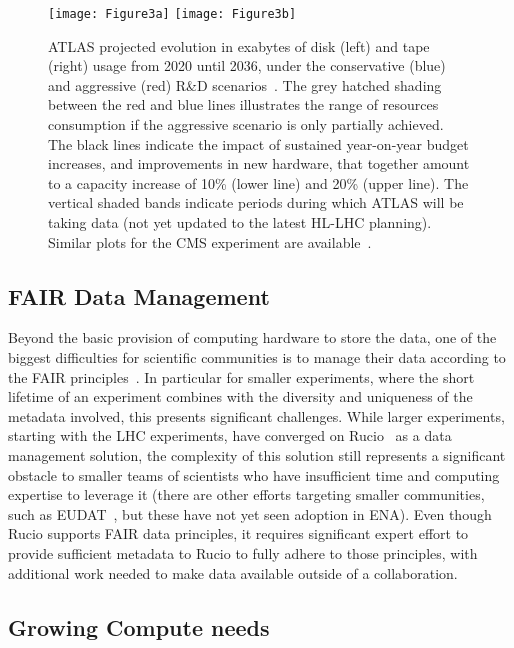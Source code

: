 \begin{figure}[htbp]
    \begin{center}
        \texttt{[image: Figure3a]} 
        \texttt{[image: Figure3b]} \\ 
        \caption{ATLAS projected evolution in exabytes of disk (left) and tape (right) usage from 2020 until 2036, under the conservative (blue) and aggressive (red) R\&D scenarios~\cite{CERN-LHCC-2022-005}. The grey hatched shading between the red and blue lines illustrates the range of resources consumption if the aggressive scenario is only partially achieved. The black lines indicate the impact of sustained year-on-year budget increases, and improvements in new hardware, that together amount to a capacity increase of 10\% (lower line) and 20\% (upper line). The vertical shaded bands indicate periods during which ATLAS will be taking data (not yet updated to the latest HL-LHC planning). Similar plots for the CMS experiment are available~\cite{Software:2815292}.}
        \label{figures:Fig3}
    \end{center}
\end{figure}


\subsection{FAIR Data Management}

Beyond the basic provision of computing hardware to store the data, one of the biggest difficulties for scientific communities is to manage their data according to the FAIR principles~\cite{Wilkinson2016}. In particular for smaller experiments, where the short lifetime of an experiment combines with the diversity and uniqueness of the metadata involved, this presents significant challenges.  While larger experiments, starting with the LHC experiments, have converged on Rucio~\cite{Barisits2019} as a data management solution, the complexity of this solution still represents a significant obstacle to smaller teams of scientists who have insufficient time and computing expertise to leverage it (there are other efforts targeting smaller communities, such as EUDAT~\cite{EUDAT}, but these have not yet seen adoption in ENA). Even though Rucio supports FAIR data principles, it requires significant expert effort to provide sufficient metadata to Rucio to fully adhere to those principles, with additional work needed to make data available outside of a collaboration.

\subsection{Growing Compute needs}

